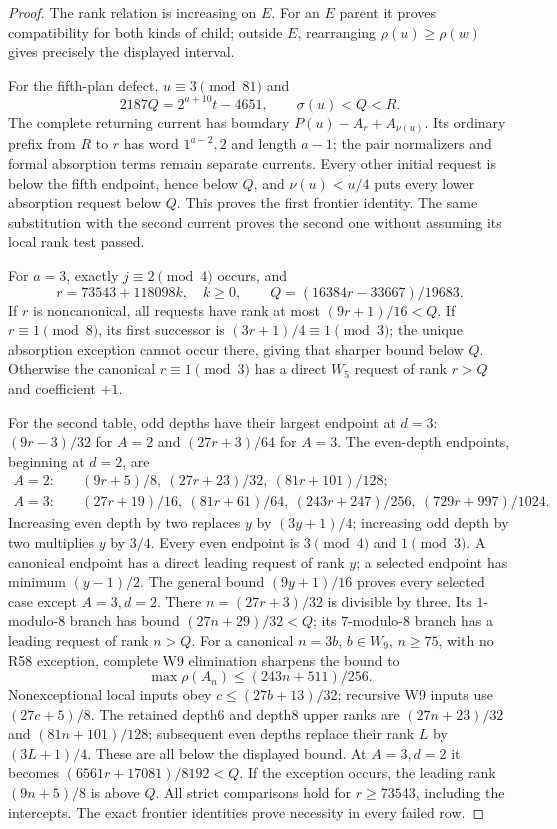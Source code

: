 \documentclass[11pt]{article}
\begin{document}
\begin{proof}
The rank relation is increasing on $E$. For an $E$ parent it proves
compatibility for both kinds of child; outside $E$, rearranging
$\rho(u)\ge\rho(w)$ gives precisely the displayed interval.

For the fifth-plan defect, $u\equiv3\pmod{81}$ and
\[
 2187Q=2^{a+10}t-4651,\qquad \sigma(u)<Q<R.
\]
The complete returning current has boundary
$P(u)-A_r+A_{\nu(u)}$. Its ordinary prefix from $R$ to $r$ has
word $1^{a-2},2$ and length $a-1$; the pair normalizers and formal
absorption terms remain separate currents. Every other initial request
is below the fifth endpoint, hence below $Q$, and
$\nu(u)<u/4$ puts every lower absorption request below $Q$.
This proves the first frontier identity. The same substitution with the
second current proves the second one without assuming its local rank
test passed.

For $a=3$, exactly $j\equiv2\pmod4$ occurs, and
\[
 r=73543+118098k,\quad k\ge0,\qquad
 Q=(16384r-33667)/19683.
\]
If $r$ is noncanonical, all requests have rank at most $(9r+1)/16<Q$.
If $r\equiv1\pmod8$, its first successor is $(3r+1)/4\equiv1\pmod3$;
the unique absorption exception cannot occur there, giving that sharper
bound below $Q$. Otherwise the canonical $r\equiv1\pmod3$ has a
direct $W_5$ request of rank $r>Q$ and coefficient $+1$.

For the second table, odd depths have their largest endpoint at $d=3$:
$(9r-3)/32$ for $A=2$ and $(27r+3)/64$ for $A=3$.
The even-depth endpoints, beginning at $d=2$, are
\[
\begin{split}
A=2:\quad &(9r+5)/8,\ (27r+23)/32,\ (81r+101)/128;\\
A=3:\quad &(27r+19)/16,\ (81r+61)/64,\
 (243r+247)/256,\ (729r+997)/1024.
\end{split}
\]
Increasing even depth by two replaces $y$ by $(3y+1)/4$; increasing
odd depth by two multiplies $y$ by $3/4$. Every even endpoint is
$3\pmod4$ and $1\pmod3$. A canonical endpoint has a direct leading
request of rank $y$; a selected endpoint has minimum $(y-1)/2$.
The general bound $(9y+1)/16$ proves every selected case except
$A=3,d=2$. There $n=(27r+3)/32$ is divisible by three.
Its $1$-modulo-$8$ branch has bound $(27n+29)/32<Q$; its
$7$-modulo-$8$ branch has a leading request of rank $n>Q$.
For a canonical $n=3b$, $b\in W_9$, $n\ge75$, with no R58 exception,
complete W9 elimination sharpens the bound to
\[
 \max\rho(A_n)\le(243n+511)/256.
\]
Nonexceptional local inputs obey $c\le(27b+13)/32$; recursive W9
inputs use $(27c+5)/8$. The retained depth6 and depth8 upper ranks are
$(27n+23)/32$ and $(81n+101)/128$; subsequent even depths replace
their rank $L$ by $(3L+1)/4$. These are all below the displayed bound.
At $A=3,d=2$ it becomes $(6561r+17081)/8192<Q$.
If the exception occurs, the leading rank $(9n+5)/8$ is above $Q$.
All strict comparisons hold for $r\ge73543$, including the intercepts.
The exact frontier identities prove necessity in every failed row.
\end{proof}
\end{document}
